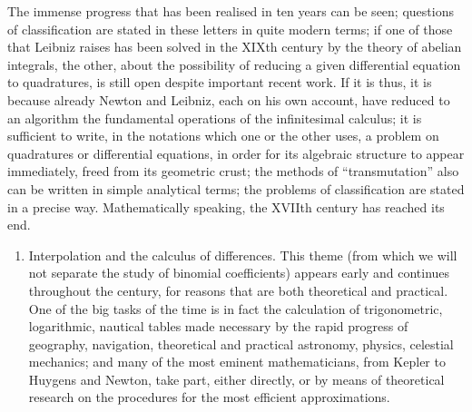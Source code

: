 The immense progress that has been realised in ten years can be seen; questions of classification are stated in these letters in quite modern terms; if one of those that Leibniz raises has been solved in the XIXth century by the theory of abelian integrals, the other, about the possibility of reducing a given differential equation to quadratures, is still open despite important recent work. If it is thus, it is because already Newton and Leibniz, each on his own account, have reduced to an algorithm the fundamental operations of the infinitesimal calculus; it is sufficient to write, in the notations which one or the other uses, a problem on quadratures or differential equations, in order for its algebraic structure to appear immediately, freed from its geometric crust; the methods of ``transmutation'' also can be written in simple analytical terms; the problems of classification are stated in a precise way. Mathematically speaking, the XVIIth century has reached its end.

\begin{enumerate}
\def\labelenumi{\Alph{enumi})}
\setcounter{enumi}{4}
\tightlist
\item
  Interpolation and the calculus of differences. This theme (from which we will not separate the study of binomial coefficients) appears early and continues throughout the century, for reasons that are both theoretical and practical. One of the big tasks of the time is in fact the calculation of trigonometric, logarithmic, nautical tables made necessary by the rapid progress of geography, navigation, theoretical and practical astronomy, physics, celestial mechanics; and many of the most eminent mathematicians, from Kepler to Huygens and Newton, take part, either directly, or by means of theoretical research on the procedures for the most efficient approximations.
\end{enumerate}

